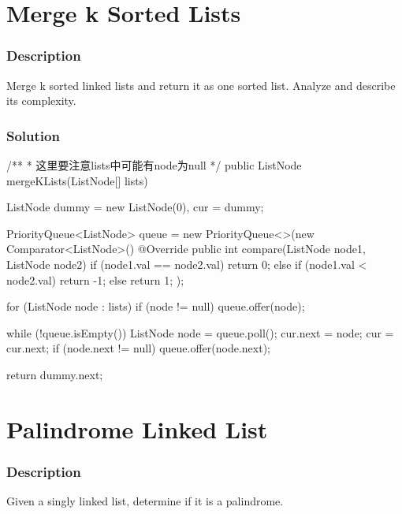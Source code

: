 \newpage

\section{Merge k Sorted Lists} %

\subsubsection{Description}
Merge k sorted linked lists and return it as one sorted list. Analyze and describe its complexity.

\subsubsection{Solution}

\begin{Code}
/**
 * 这里要注意lists中可能有node为null
 */
public ListNode mergeKLists(ListNode[] lists) {
    ListNode dummy = new ListNode(0), cur = dummy;

    PriorityQueue<ListNode> queue = new PriorityQueue<>(new Comparator<ListNode>() {
        @Override
        public int compare(ListNode node1, ListNode node2) {
            if (node1.val == node2.val) {
                return 0;
            } else if (node1.val < node2.val) {
                return -1;
            } else {
                return 1;
            }
        }
    });

    for (ListNode node : lists) {
        if (node != null) {
            queue.offer(node);
        }
    }

    while (!queue.isEmpty()) {
        ListNode node = queue.poll();
        cur.next = node;
        cur = cur.next;
        if (node.next != null) {
            queue.offer(node.next);
        }
    }

    return dummy.next;
}
\end{Code}

\newpage

\section{Palindrome Linked List} %

\subsubsection{Description}
Given a singly linked list, determine if it is a palindrome.

